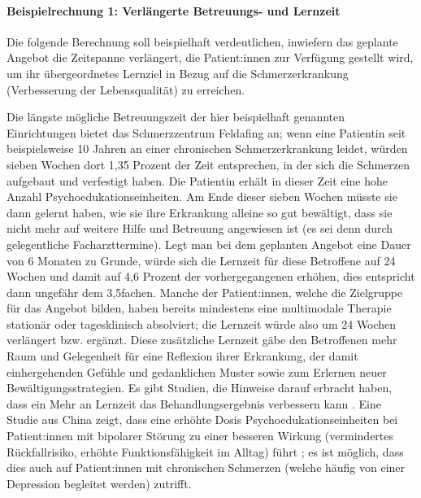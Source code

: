 \documentclass[
  twoside,
  parskip=half-,
]{scrreprt}
\begin{document}
\begin{praxis}
  \paragraph{Beispielrechnung 1: Verlängerte Betreuungs- und Lernzeit}
Die folgende Berechnung soll beispielhaft verdeutlichen, inwiefern das geplante Angebot die Zeitspanne verlängert, die Patient:innen zur Verfügung gestellt wird, um ihr übergeordnetes Lernziel in Bezug auf die Schmerzerkrankung (Verbesserung der Lebensqualität) zu erreichen.

Die längste mögliche Betreuungszeit der hier beispielhaft genannten Einrichtungen bietet das Schmerzzentrum Feldafing an; wenn eine Patientin seit beispielsweise 10 Jahren an einer chronischen Schmerzerkrankung leidet, würden sieben Wochen dort 1,35 Prozent der Zeit entsprechen, in der sich die Schmerzen aufgebaut und verfestigt haben. Die Patientin erhält in dieser Zeit eine hohe Anzahl Psychoedukationseinheiten. Am Ende dieser sieben Wochen müsste sie dann gelernt haben, wie sie ihre Erkrankung alleine so gut bewältigt, dass sie nicht mehr auf weitere Hilfe und Betreuung angewiesen ist (es sei denn durch gelegentliche Facharzttermine). Legt man bei dem geplanten Angebot eine Dauer von 6 Monaten zu Grunde, würde sich die Lernzeit für diese Betroffene auf 24 Wochen und damit auf 4,6 Prozent der vorhergegangenen  erhöhen, dies entspricht dann ungefähr dem 3,5fachen. Manche der Patient:innen, welche die Zielgruppe für das Angebot bilden, haben bereits mindestens eine multimodale Therapie stationär oder tagesklinisch absolviert; die Lernzeit würde also um 24 Wochen verlängert bzw. ergänzt. Diese zusätzliche Lernzeit gäbe den Betroffenen mehr Raum und Gelegenheit für eine Reflexion ihrer Erkrankung, der damit einhergehenden Gefühle und gedanklichen Muster sowie zum Erlernen neuer Bewältigungsstrategien. Es gibt Studien, die Hinweise darauf erbracht haben, dass ein Mehr an Lernzeit das Behandlungsergebnis verbessern kann \autocite[vgl. Engers et al. 2008, zit. n.][20]{wachter}. Eine Studie aus China zeigt, dass eine erhöhte Dosis Psychoedukationseinheiten bei Patient:innen mit bipolarer Störung zu einer besseren Wirkung (vermindertes Rückfallrisiko, erhöhte Funktionsfähigkeit im Alltag) führt \autocite[vgl. Chen Chen R. et al. 2019, zit. n.][]{China}; es ist möglich, dass dies auch auf Patient:innen mit chronischen Schmerzen (welche häufig von einer Depression begleitet werden) zutrifft.

\end{praxis}
\end{document}
